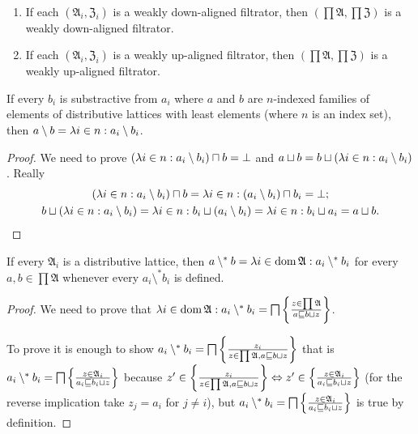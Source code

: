 \begin{obvious}
~
\begin{enumerate}
\item If each $(\mathfrak{A}_{i},\mathfrak{Z}_{i})$ is a weakly down-aligned filtrator,
then $\left(\prod\mathfrak{A},\prod\mathfrak{Z}\right)$ is a weakly down-aligned
filtrator.
\item If each $(\mathfrak{A}_{i},\mathfrak{Z}_{i})$ is a weakly up-aligned filtrator,
then $\left(\prod\mathfrak{A},\prod\mathfrak{Z}\right)$ is a weakly up-aligned
filtrator.
\end{enumerate}
\end{obvious}
\begin{prop}
If every $b_{i}$ is substractive from $a_{i}$ where $a$ and $b$
are $n$-indexed families of elements of distributive lattices with least elements
(where $n$ is an index set), then $a\setminus b=\lambda i\in n:a_{i}\setminus b_{i}$.\end{prop}
\begin{proof}
We need to prove $(\lambda i\in n:a_{i}\setminus b_{i})\sqcap b=\bot$
and $a\sqcup b=b\sqcup(\lambda i\in n:a_{i}\setminus b_{i})$. Really
\begin{gather*}
(\lambda i\in n:a_{i}\setminus b_{i})\sqcap b=\lambda i\in n:(a_{i}\setminus b_{i})\sqcap b_{i}=\bot;\\
b\sqcup(\lambda i\in n:a_{i}\setminus b_{i})=\lambda i\in n:b_{i}\sqcup(a_{i}\setminus b_{i})=\lambda i\in n:b_{i}\sqcup a_{i}=a\sqcup b.
\end{gather*}
\end{proof}
\begin{prop}
If every $\mathfrak{A}_{i}$ is a distributive lattice, then $a\setminus^{\ast}b=\lambda i\in\operatorname{dom}\mathfrak{A}:a_{i}\setminus^{\ast}b_{i}$
for every $a,b\in\prod\mathfrak{A}$ whenever every $a_{i}\setminus^{\ast}b_{i}$
is defined.\end{prop}
\begin{proof}
We need to prove that $\lambda i\in\operatorname{dom}\mathfrak{A}:a_{i}\setminus^{\ast}b_{i}=\bigsqcap\left\{ \frac{z\in\prod\mathfrak{A}}{a\sqsubseteq b\sqcup z}\right\}$.

To prove it is enough to show $a_{i}\setminus^{\ast}b_{i}=\bigsqcap\left\{ \frac{z_{i}}{z\in\prod\mathfrak{A},a\sqsubseteq b\sqcup z}\right\}$
that is $a_{i}\setminus^{\ast}b_{i}=\bigsqcap\left\{ \frac{z\in\mathfrak{A}_{i}}{a_{i}\sqsubseteq b_{i}\sqcup z}\right\}$
because $z'\in\left\{ \frac{z_{i}}{z\in\prod\mathfrak{A},a\sqsubseteq b\sqcup z}\right\} \Leftrightarrow z'\in\left\{ \frac{z\in\mathfrak{A}_{i}}{a_{i}\sqsubseteq b_{i}\sqcup z}\right\}$
(for the reverse implication take $z_{j}=a_{i}$ for $j\neq i$),
but $a_{i}\setminus^{\ast}b_{i}=\bigsqcap\left\{ \frac{z\in\mathfrak{A}_{i}}{a_{i}\sqsubseteq b_{i}\sqcup z}\right\}$ is true by definition.\end{proof}
